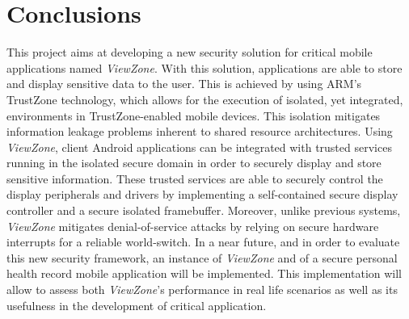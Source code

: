 
% 
% 

\section{Conclusions}
\label{sec:conclusion}

This project aims at developing a new security solution for critical mobile applications named \emph{ViewZone}. With this solution, applications are able to store and display sensitive data to the user. This is achieved by using ARM's TrustZone technology, which allows for the execution of isolated, yet integrated, environments in TrustZone-enabled mobile devices. This isolation mitigates information leakage problems inherent to shared resource architectures. Using \emph{ViewZone}, client Android applications can be integrated with trusted services running in the isolated secure domain in order to securely display and store sensitive information. These trusted services are able to securely control the display peripherals and drivers by implementing a self-contained secure display controller and a secure isolated framebuffer. Moreover, unlike previous systems, \emph{ViewZone} mitigates denial-of-service attacks by relying on secure hardware interrupts for a reliable world-switch. In a near future, and in order to evaluate this new security framework, an instance of \emph{ViewZone} and of a secure personal health record mobile application will be implemented. This implementation will allow to assess both \emph{ViewZone}'s performance in real life scenarios as well as its usefulness in the development of critical application.